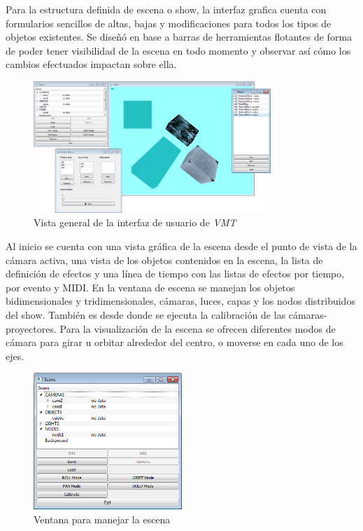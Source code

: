 Para la estructura definida de escena o show, la interfaz grafica cuenta con formularios sencillos de altas, bajas y modificaciones para todos los tipos de objetos existentes. Se diseñó en base a barras de herramientas flotantes de forma de poder tener visibilidad de la escena en todo momento y observar así cómo los cambios efectuados impactan sobre ella.

\begin{figure}[H]
  \centering
    \includegraphics[width=0.8\textwidth]{./Cap5_vmt/vmt_todo.png}
  \caption{Vista general de la interfaz de usuario de \emph{VMT}}
  \label{fig:VMT-MainWindow}
\end{figure}

Al inicio se cuenta con una vista gráfica de la escena desde el punto de vista de la cámara activa, una vista de los objetos contenidos en la escena, la lista de definición de efectos y una línea de tiempo con las listas de efectos por tiempo, por evento y MIDI.
En la ventana de escena se manejan los objetos bidimensionales y tridimensionales, cámaras, luces, capas y los nodos distribuidos del show. También es desde donde se ejecuta la calibración de las cámaras-proyectores. Para la visualización de la escena se ofrecen diferentes modos de cámara para girar u orbitar alrededor del centro, o moverse en cada uno de los ejes.

\begin{figure}[H]
  \centering
    \includegraphics[width=0.5\textwidth]{./Cap5_vmt/vmt_scene.png}
  \caption{Ventana para manejar la escena}
  \label{fig:VMT-SceneWindow}
\end{figure}

